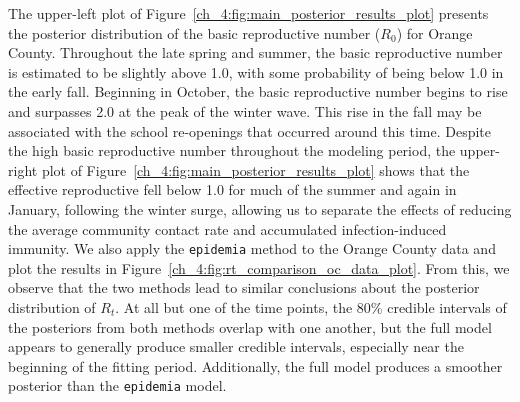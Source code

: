 The upper-left plot of Figure~\ref{ch_4:fig:main_posterior_results_plot} presents the posterior distribution of the basic reproductive number ($R_0$) for Orange County.
Throughout the late spring and summer, the basic reproductive number is estimated to be slightly above 1.0, with some probability of being below 1.0 in the early fall.
Beginning in October, the basic reproductive number begins to rise and surpasses 2.0 at the peak of the winter wave.
This rise in the fall may be associated with the school re-openings that occurred around this time. %
Despite the high basic reproductive number throughout the modeling period, the upper-right plot of Figure~\ref{ch_4:fig:main_posterior_results_plot} shows that the effective reproductive fell below 1.0 for much of the summer and again in January, following the winter surge, allowing us to separate the effects of reducing the average community contact rate and accumulated infection-induced immunity.
We also apply the \texttt{epidemia} method to the Orange County data and plot the results in Figure~\ref{ch_4:fig:rt_comparison_oc_data_plot}.
From this, we observe that the two methods lead to similar conclusions about the posterior distribution of \( R_t \).
At all but one of the time points, the 80\% credible intervals of the posteriors from both methods overlap with one another, but the full model appears to generally produce smaller credible intervals, especially near the beginning of the fitting period.
Additionally, the full model produces a smoother posterior than the \texttt{epidemia} model.

